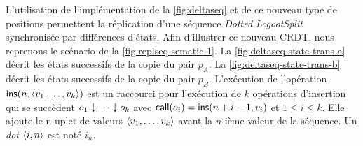 
L'utilisation de l'implémentation de la \autoref{fig:deltaseq} et de ce nouveau type de positions permettent la réplication d'une séquence \emph{Dotted LogootSplit} synchronisée par différences d'états.
Afin d'illustrer ce nouveau \ac{CRDT}, nous reprenons le scénario de la \autoref{fig:replseq-sematic-1}.
La \autoref{fig:deltaseq-state-trans-a} décrit les états successifs de la copie du pair $p_A$.
La \autoref{fig:deltaseq-state-trans-b} décrit les états successifs de la copie du pair $p_B$.
L'exécution de l'opération $\trm{ins}(n, \tuple*{v_1,\dotsc,v_k})$ est un raccourci pour l'exécution de $k$ opérations d'insertion qui se succèdent $o_1 \idr \dotsb \idr o_k$ avec $\trm{call}(o_i) = \trm{ins}(n+i-1, v_i)$ et $1 \leq i \leq k$.
Elle ajoute le n-uplet de valeurs $\tuple*{v_1,\dotsc,v_k}$ avant la $n$-ième valeur de la séquence.
Un \emph{dot} $\tuple*{i, n}$ est noté $i_n$.

